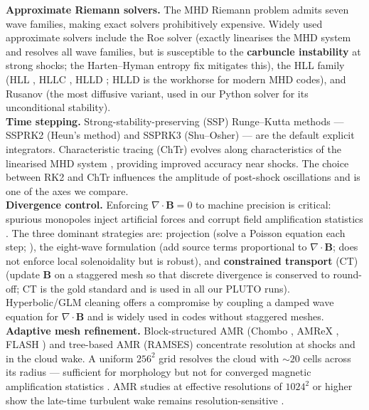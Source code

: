 \documentclass[11pt,a4paper]{article}
\begin{document}
\textbf{Approximate Riemann solvers.} The MHD Riemann problem admits seven wave families, making exact solvers prohibitively expensive. Widely used approximate solvers include the Roe solver \cite{roe1981} (exactly linearises the MHD system and resolves all wave families, but is susceptible to the \textbf{carbuncle instability} at strong shocks; the Harten--Hyman entropy fix \cite{harten-hyman} mitigates this), the HLL family (HLL \cite{harten1983}, HLLC \cite{toro1994}, HLLD \cite{miyoshi2005}; HLLD is the workhorse for modern MHD codes), and Rusanov (the most diffusive variant, used in our Python solver for its unconditional stability).
\\

\textbf{Time stepping.} Strong-stability-preserving (SSP) Runge--Kutta methods --- SSPRK2 (Heun's method) and SSPRK3 (Shu--Osher) \cite{shu1988} --- are the default explicit integrators. Characteristic tracing (ChTr) evolves along characteristics of the linearised MHD system \cite{yee2007}, providing improved accuracy near shocks. The choice between RK2 and ChTr influences the amplitude of post-shock oscillations and is one of the axes we compare.
\\

\textbf{Divergence control.} Enforcing $\nabla\!\cdot\!\mathbf{B}=0$ to machine precision is critical: spurious monopoles inject artificial forces and corrupt field amplification statistics \cite{brackbill1980}. The three dominant strategies are: projection (solve a Poisson equation each step; \cite{brackbill1980}), the eight-wave formulation \cite{powell1999} (add source terms proportional to $\nabla\!\cdot\!\mathbf{B}$; does not enforce local solenoidality but is robust), and \textbf{constrained transport} (CT) \cite{evans1988, toth2000, gardiner2005} (update $\mathbf{B}$ on a staggered mesh so that discrete divergence is conserved to round-off; CT is the gold standard and is used in all our PLUTO runs). Hyperbolic/GLM cleaning \cite{dedner2002} offers a compromise by coupling a damped wave equation for $\nabla\!\cdot\!\mathbf{B}$ and is widely used in codes without staggered meshes.
\\

\textbf{Adaptive mesh refinement.} Block-structured AMR (Chombo \cite{colella2009}, AMReX \cite{zhang2020}, FLASH \cite{fryxell2000}) and tree-based AMR (RAMSES) concentrate resolution at shocks and in the cloud wake. A uniform $256^2$ grid resolves the cloud with $\sim 20$ cells across its radius --- sufficient for morphology but not for converged magnetic amplification statistics \cite{gregori2000}. AMR studies at effective resolutions of $1024^2$ or higher show the late-time turbulent wake remains resolution-sensitive \cite{miniati1999, schneider2017}.
\\
\end{document}

